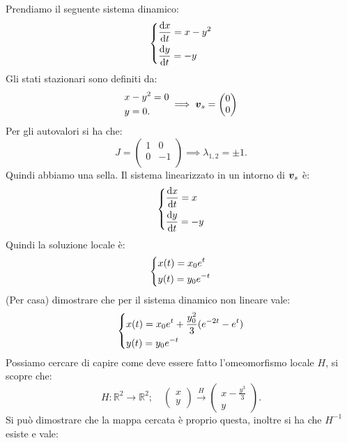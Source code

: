 \begin{exmp}
Prendiamo il seguente sistema dinamico:
\[
\begin{dcases}
\frac{\text{d} x}{\text{d} t} = x-y^2\\
\frac{\text{d} y}{\text{d} t} = -y
\end{dcases}
\]
Gli stati stazionari sono definiti da:
\[\begin{aligned}
    &x-y^2=0\\
    &y = 0
.\end{aligned}
\implies 
\boldsymbol{v}_s = \begin{pmatrix} 0 \\ 0 \end{pmatrix}
\]
Per gli autovalori si ha che:
\[
    J = 
\begin{pmatrix}
    1  & 0 \\
    0 & -1 \\
\end{pmatrix}
\implies  \lambda_{1, 2} = \pm 1
.\] 
Quindi abbiamo una sella. Il sistema linearizzato in un intorno di $\boldsymbol{v}_s$  è:
\[
\begin{dcases}
\frac{\text{d} x}{\text{d} t} = x \\
\frac{\text{d} y}{\text{d} t} = -y
\end{dcases}
\]
Quindi la soluzione locale è:
\[
\begin{dcases}
    x(t) = x_0e^t\\
    y(t) = y_0e^{-t}
\end{dcases}
\]
(Per casa) dimostrare che per il sistema dinamico non lineare vale:
\begin{equation}
\begin{dcases}
    x(t) = x_0e^{t} + \frac{y_0^2}{3}(e^{-2t}-e^t) \\
    y(t) = y_0e^{-t}
\end{dcases}
\label{eq:8_1}
\end{equation}
Possiamo cercare di capire come deve essere fatto l'omeomorfismo locale $H$, si scopre che:
\[
    H:\mathbb{R}^2\to \mathbb{R}^2; \quad  
    \begin{pmatrix} x \\ y \end{pmatrix} \xrightarrow{H} \begin{pmatrix} x-\frac{y^3}{3} \\ y \end{pmatrix}
.\] 
Si può dimostrare che la mappa cercata è proprio questa, inoltre si ha che $H^{-1}$  esiste e vale:

\end{exmp}
